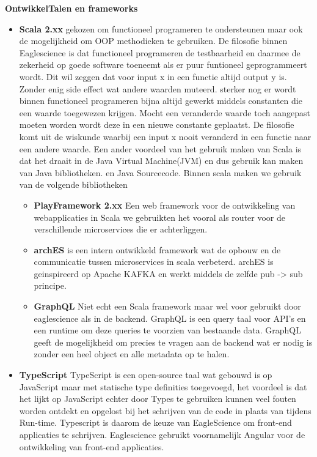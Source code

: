 \textbf{OntwikkelTalen en frameworks}
\begin{itemize}
\item \textbf{Scala 2.xx} gekozen om functioneel programeren te ondersteunen maar ook de mogelijkheid om OOP methodieken te gebruiken. De filosofie binnen Eaglescience is dat functioneel programeren de testbaarheid en daarmee de zekerheid op goede software toeneemt als er puur funtioneel geprogrammeert wordt. Dit wil zeggen dat voor input x in een functie altijd output y is. Zonder enig side effect wat andere waarden muteerd. sterker nog er wordt binnen functioneel programeren bijna altijd gewerkt middels constanten die een waarde toegewezen krijgen. Mocht een veranderde waarde toch aangepast moeten worden wordt deze in een nieuwe constante geplaatst. De filosofie komt uit de wiskunde waarbij een input x nooit veranderd in een functie naar een andere waarde. Een ander voordeel van het gebruik maken van Scala is dat het draait in de Java Virtual Machine(JVM) en dus gebruik kan maken van Java bibliotheken. en Java Sourcecode. Binnen scala maken we gebruik van de volgende bibliotheken
  \begin{itemize}
    \item \textbf{PlayFramework 2.xx} Een web framework voor de ontwikkeling van webapplicaties in Scala we gebruikten het vooral als router voor de verschillende microservices die er achterliggen.
    \item \textbf{archES} is een intern ontwikkeld framework wat de opbouw en de communicatie tussen microservices in scala verbeterd. archES is geinspireerd op Apache KAFKA en werkt middels de zelfde pub -> sub principe.
    \item \textbf{GraphQL} Niet echt een Scala framework maar wel voor gebruikt door eaglescience als in de backend. GraphQL is een query taal voor API's en een runtime om deze queries te voorzien van bestaande data. GraphQL geeft de mogelijkheid om precies te vragen aan de backend wat er nodig is zonder een heel object en alle metadata op te halen.
  \end{itemize}
\item \textbf{TypeScript} TypeScript is een open-source taal wat gebouwd is op JavaScript maar met statische type definities toegevoegd, het voordeel is dat het lijkt op JavaScript echter door Types te gebruiken kunnen veel fouten worden ontdekt en opgelost bij het schrijven van de code in plaats van tijdens Run-time. Typescript is daarom de keuze van EagleScience om front-end applicaties te schrijven. Eaglescience gebruikt voornamelijk Angular voor de ontwikkeling van front-end applicaties.
\end{itemize}
